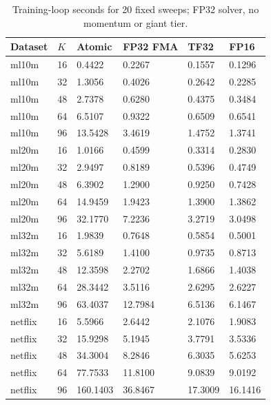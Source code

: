 \begin{table}
\centering
\caption{Training-loop seconds for 20 fixed sweeps; FP32 solver, no momentum or giant tier.}
\begin{tabular}{llllll}
\hline
Dataset & $K$ & Atomic & FP32 FMA & TF32 & FP16 \\
\hline
ml10m & 16 & 0.4422 & 0.2267 & 0.1557 & 0.1296 \\
ml10m & 32 & 1.3056 & 0.4026 & 0.2642 & 0.2285 \\
ml10m & 48 & 2.7378 & 0.6280 & 0.4375 & 0.3484 \\
ml10m & 64 & 6.5107 & 0.9322 & 0.6509 & 0.6541 \\
ml10m & 96 & 13.5428 & 3.4619 & 1.4752 & 1.3741 \\
ml20m & 16 & 1.0166 & 0.4599 & 0.3314 & 0.2830 \\
ml20m & 32 & 2.9497 & 0.8189 & 0.5396 & 0.4749 \\
ml20m & 48 & 6.3902 & 1.2900 & 0.9250 & 0.7428 \\
ml20m & 64 & 14.9459 & 1.9423 & 1.3900 & 1.3862 \\
ml20m & 96 & 32.1770 & 7.2236 & 3.2719 & 3.0498 \\
ml32m & 16 & 1.9839 & 0.7648 & 0.5854 & 0.5001 \\
ml32m & 32 & 5.6189 & 1.4100 & 0.9735 & 0.8713 \\
ml32m & 48 & 12.3598 & 2.2702 & 1.6866 & 1.4038 \\
ml32m & 64 & 28.3442 & 3.5116 & 2.6295 & 2.6227 \\
ml32m & 96 & 63.4037 & 12.7984 & 6.5136 & 6.1467 \\
netflix & 16 & 5.5966 & 2.6442 & 2.1076 & 1.9083 \\
netflix & 32 & 15.9298 & 5.1945 & 3.7791 & 3.5336 \\
netflix & 48 & 34.3004 & 8.2846 & 6.3035 & 5.6253 \\
netflix & 64 & 77.7533 & 11.8100 & 9.0839 & 9.0192 \\
netflix & 96 & 160.1403 & 36.8467 & 17.3009 & 16.1416 \\
\hline
\end{tabular}
\end{table}
